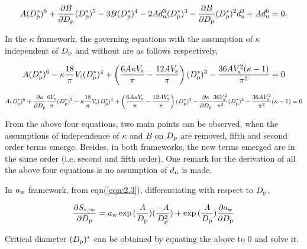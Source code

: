 \documentclass[12pt]{article}
\begin{document}
{\begin{equation}\label{eqn:12.2}
A(D_{\rm p}^{*})^{6}+ 
\frac{\partial B}{\partial D_{\rm p}}(D_{\rm p}^{*})^{5}-3B(D_{\rm p}^{*})^{4}-2 Ad_{\rm u}^{3} (D_{\rm p}^{*})^{3} 
-\frac{\partial B}{\partial D_{\rm p}}(D_{\rm p}^{*})^{2}d_{\rm u}^{3}+ A d_{\rm u}^{6}=0.
\end{equation}

In the $\kappa$ framework, the governing equations with the assumption of $\kappa$ independent of $D_{\rm p}$ and without are as follows respectively, 

\begin{equation}\label{eqn:12.3}
A(D_{\rm p}^{*})^{6}-\kappa\frac{18}{\pi}V_{\rm s}(D_{\rm p}^{*})^4+\left(\frac{6 A \kappa V_{\rm s}}{\pi}-\frac{12 A V_{\rm s}}{\pi}\right)(D_{\rm p}^{*})^{3} - \frac{36A V_{\rm s}^2(\kappa -1)}{\pi^2} =0
\end{equation}

\begin{equation}\label{eqn:12.4}
A(D_{\rm p}^{*})^{6}+
\frac{\partial \kappa}{\partial D_{\rm p}}\frac{6 V_{\rm s}}{\pi}(D_{\rm p}^{*})^{5}
-\kappa\frac{18}{\pi}V_{\rm s}(D_{\rm p}^{*})^4+
\left(\frac{6 A \kappa V_{\rm s}}{\pi}-\frac{12 A V_{\rm s}}{\pi}\right)(D_{\rm p}^{*})^{3}
-\frac{\partial \kappa}{\partial D_{\rm p}}\frac{36 V_{\rm s}^{2}}{\pi^{2}}(D_{\rm p}^{*})^{2}
 -\frac{36 A V_{\rm s}^{2}}{\pi^{2}}(\kappa -1) =0
\end{equation}

From the above four equations, two main points can be observed, when the assumptions of independence of $\kappa$ and $B$ on $D_{\rm p}$ are removed, fifth and second order terms emerge. Besides, in both frameworks, 
the new terms emerged are in the same order (i.e. second and fifth order). One remark for the derivation of all the above four equations is no assumption of $d_{\rm u}$ is made.

In $a_{\rm w}$ framework, from eqn(\ref{eqn:2.3}), differentiating with respect to $D_{\rm p}$, 

\begin{equation}\label{eqn:12.5.1}
\frac{\partial S_{\rm v, \infty}}{\partial D_{\rm p}}=a_{\rm w}\exp{(\frac{A}{D_{\rm p}})}(\frac{-A}{D_{\rm p}^{2}})+\exp{(\frac{A}{D_{\rm p}})} \frac{\partial a_{\rm w}}{\partial D_{\rm p}}
\end{equation}

Critical diameter $(D_{\rm p})^{*}$ can be obtained by equating the above to $0$ and solve it.

}
\end{document}
